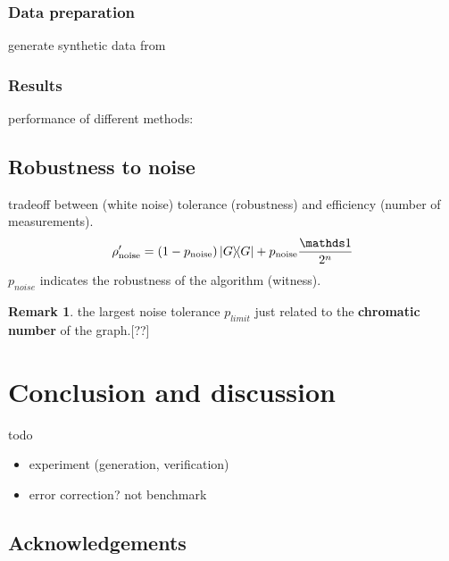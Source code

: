 \documentclass[
aps,
pra,
linenumbers,
floatfix,
]{revtex4-2}
\theoremstyle{plain}
\theoremstyle{definition}
\newtheorem{remark}{Remark}
\newcommand{\noise}{\text{noise}}
\newcommand{\dm}{\rho}
\begin{document}
\subsubsection{Data preparation}
generate synthetic data from

\subsubsection{Results}
performance of different methods: 

\subsection{Robustness to noise}
tradeoff between (white noise) tolerance (robustness) and efficiency (number of measurements).
\begin{equation}
	\dm_{\noise}' = (1-p_{\noise}) \op{G} + p_{\noise} \frac{\identity}{2^n}
\end{equation}
$p_{noise}$ indicates the robustness of the algorithm (witness).
\begin{remark}
	the largest noise tolerance $p_{limit}$ just related to the \textbf{chromatic number} of the graph.[??]
\end{remark}
% 
% 

\section{Conclusion and discussion}
todo
\begin{itemize}
	\item experiment (generation, verification) \cite{luEntanglementStructureEntanglement2018}
	\item error correction? not benchmark
\end{itemize}

\subsection*{Acknowledgements}
\end{document}
